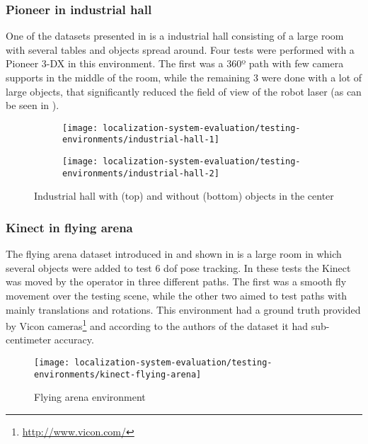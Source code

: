 \subsubsection{Pioneer in industrial hall}

One of the datasets presented in \cite{Sturm2012} is a industrial hall consisting of a large room with several tables and objects spread around. Four tests were performed with a Pioneer 3-DX in this environment. The first was a 360º path with few camera supports in the middle of the room, while the remaining 3 were done with a lot of large objects, that significantly reduced the field of view of the robot laser (as can be seen in ).

\begin{figure}[ht]
	\centering
	\begin{subfigure}[ht]{0.45\textwidth}
		\centering
		\texttt{[image: localization-system-evaluation/testing-environments/industrial-hall-1]}
	\end{subfigure}
	\begin{subfigure}[ht]{0.45\textwidth}
		\centering
		\texttt{[image: localization-system-evaluation/testing-environments/industrial-hall-2]}
	\end{subfigure}
	\caption{Industrial hall with (top) and without (bottom) objects in the center \cite{Sturm2012}}
	\label{fig:localization-system-evaluation_industrial-hall}
\end{figure}



\subsubsection{Kinect in flying arena}

The flying arena dataset introduced in \cite{Pomerleau2011} and shown in  is a large room in which several objects were added to test 6 \gls{dof} pose tracking. In these tests the Kinect was moved by the operator in three different paths. The first was a smooth fly movement over the testing scene, while the other two aimed to test paths with mainly translations and rotations. This environment had a ground truth provided by Vicon cameras\footnote{\url{http://www.vicon.com/}} and according to the authors of the dataset \cite{Pomerleau2011} it had sub-centimeter accuracy.

\begin{figure}[H]
	\centering
	\texttt{[image: localization-system-evaluation/testing-environments/kinect-flying-arena]}
	\caption{Flying arena environment \cite{Pomerleau2011}}
	\label{fig:localization-system-evaluation_flying-arena}
\end{figure}
